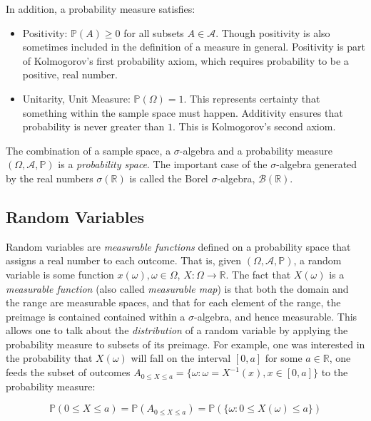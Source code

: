 In addition, a probability measure satisfies:

\begin{itemize}
\item Positivity: $\mathbb{P}(A) \geq 0$ for all subsets $A\in\mathscr{A}$. Though positivity is also sometimes included in the definition of a measure in general. Positivity is part of Kolmogorov's first probability axiom, which requires probability to be a positive, real number.
\item Unitarity, Unit Measure: $\mathbb{P}(\Omega) = 1$. This represents certainty that something within the sample space must happen. Additivity ensures that probability is never greater than $1$. This is Kolmogorov's second axiom. 
\end{itemize}

The combination of a sample space, a $\sigma$-algebra and a probability measure $(\Omega,\mathscr{A},\mathbb{P})$ is a \textit{probability space}. The important case of the $\sigma$-algebra generated by the real numbers $\sigma(\mathbb{R})$ is called the Borel $\sigma$-algebra, $\mathscr{B}(\mathbb{R})$. 

\subsection{Random Variables}
Random variables are \textit{measurable functions} defined on a probability space that assigns a real number to each outcome. That is, given $(\Omega,\mathscr{A},\mathbb{P})$, a random variable is some function $x(\omega), \omega \in \Omega$, $X:\Omega \rightarrow \mathbb{R}$. The fact that $X(\omega)$ is a \textit{measurable function} (also called \textit{measurable map}) is that both the domain and the range are measurable spaces, and that for each element of the range, the preimage is contained contained within a $\sigma$-algebra, and hence measurable. This allows one to talk about the \textit{distribution} of a random variable by applying the probability measure to subsets of its preimage. For example, one was interested in the probability that $X(\omega)$ will fall on the interval $[0,a]$ for some $a\in \mathbb{R}$, one feeds the subset of outcomes $A_{0\leq X\leq a} = \{\omega : \omega=X^{-1}(x), x \in [0,a]\}$ to the probability measure:

\begin{equation}
\mathbb{P}(0\leq X \leq a) = \mathbb{P}(A_{0\leq X\leq a}) = \mathbb{P}(\{\omega : 0\leq X(\omega) \leq a\})
\end{equation} 


